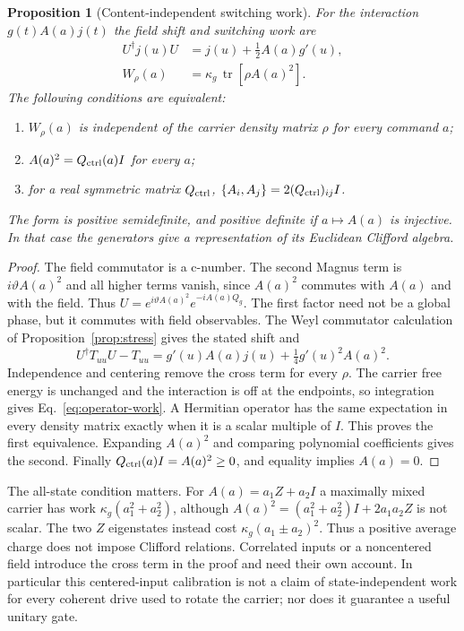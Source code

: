 \documentclass[aps,pre,onecolumn,superscriptaddress,floatfix,longbibliography]{revtex4-2}
\newtheorem{proposition}[theorem]{Proposition}
\begin{document}
\begin{proposition}[Content-independent switching work]
\label{prop:content-independent-work}
For the interaction $g(t)A(a)j(t)$ the field shift and switching work are
\begin{align}
 U^\dagger j(u)U&=j(u)+\tfrac12A(a)g'(u),\\
 W_\rho(a)&=\kappa_g\,\operatorname{tr}\!\left[\rho A(a)^2\right].
 \label{eq:operator-work}
\end{align}
The following conditions are equivalent:
\begin{enumerate}
\item $W_\rho(a)$ is independent of the carrier density matrix $\rho$
for every command $a$;
\item $A(a)^2=Q_{\rm ctrl}(a)I$ for every $a$;
\item for a real symmetric matrix $Q_{\rm ctrl}$,
$\{A_i,A_j\}=2(Q_{\rm ctrl})_{ij}I$.
\end{enumerate}
The form is positive semidefinite, and positive definite if
$a\mapsto A(a)$ is injective. In that case the generators give a
representation of its Euclidean Clifford algebra.
\end{proposition}

\begin{proof}
The field commutator is a c-number. The second Magnus term is
$i\vartheta A(a)^2$ and all higher terms vanish, since $A(a)^2$ commutes
with $A(a)$ and with the field. Thus
$U=e^{i\vartheta A(a)^2}e^{-iA(a)Q_g}$. The first factor need not be a
global phase, but it commutes with field observables. The Weyl
commutator calculation of Proposition~\ref{prop:stress} gives the stated
shift and
\[
 U^\dagger T_{uu}U-T_{uu}
 =g'(u)A(a)j(u)+\tfrac14g'(u)^2A(a)^2.
\]
Independence and centering remove the cross term for every $\rho$.
The carrier free energy is unchanged and the interaction is off at the
endpoints, so integration gives Eq.~\eqref{eq:operator-work}.
A Hermitian operator has the same expectation in every density matrix
exactly when it is a scalar multiple of $I$. This proves the first
equivalence. Expanding $A(a)^2$ and comparing polynomial coefficients
gives the second. Finally $Q_{\rm ctrl}(a)I=A(a)^2\ge0$, and equality
implies $A(a)=0$.
\end{proof}

The all-state condition matters. For $A(a)=a_1Z+a_2I$ a maximally mixed
carrier has work $\kappa_g(a_1^2+a_2^2)$, although
$A(a)^2=(a_1^2+a_2^2)I+2a_1a_2Z$ is not scalar. The two $Z$ eigenstates
instead cost $\kappa_g(a_1\pm a_2)^2$. Thus a positive average charge
does not impose Clifford relations. Correlated inputs or a noncentered
field introduce the cross term in the proof and need their own
account. In particular this centered-input calibration is not a claim
of state-independent work for every coherent drive used to rotate the
carrier; nor does it guarantee a useful unitary gate.
\end{document}
